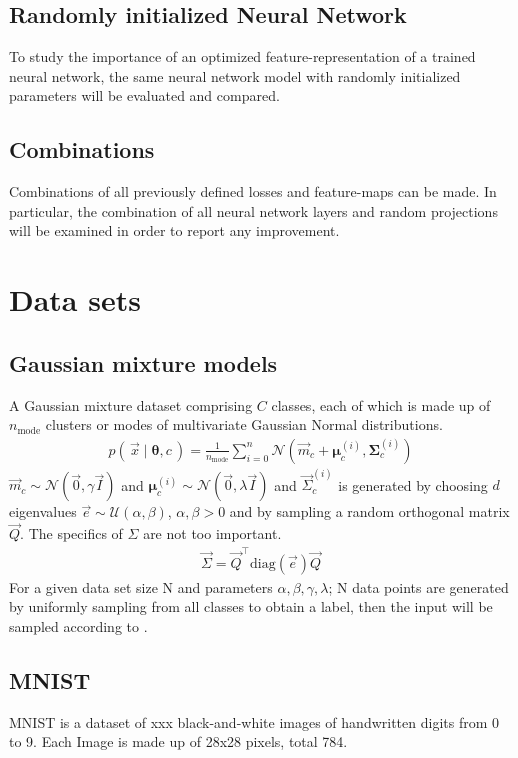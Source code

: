 \subsection{Randomly initialized Neural Network}
To study the importance of an optimized feature-representation of a trained neural network, 
the same neural network model with randomly initialized parameters will be evaluated and compared.

\subsection{Combinations}
Combinations of all previously defined losses and feature-maps can be made. In particular, the combination of all neural network layers and random projections will be examined in order to report any improvement.


\section{Data sets}
\subsection{Gaussian mixture models}
A Gaussian mixture dataset comprising $C$ classes, each of which is made up of $n_\text{mode}$ clusters or modes of multivariate Gaussian Normal distributions.
\begin{align}
\label{eqn:gmmdistr}
    p(\, \vec x \mid \boldsymbol \theta, c \,) = \frac 1 {n_\text{mode}} \sum _{i=0}^n
    \mathcal N (\vec m_c + \boldsymbol \mu_c^{(i)}, \boldsymbol \Sigma_c^{(i)})
\end{align}
$\vec m_c \sim \mathcal N (\vec 0, \gamma \vec I)$ and
$\boldsymbol \mu_c^{(i)} \sim \mathcal N (\vec 0, \lambda \vec I)$ and
$\vec \Sigma_c^{(i)}$ is generated by choosing $d$ eigenvalues $\vec e \sim \mathcal U(\alpha, \beta)$, $\alpha, \beta > 0$ and 
by sampling a random orthogonal matrix $\vec Q$. The specifics of $\Sigma$ are not too important.
\begin{align*}
    \vec \Sigma = \vec Q^\top \text{diag}(\vec e) \vec Q
\end{align*}
For a given data set size N and parameters $\alpha, \beta, \gamma, \lambda$; N data points are generated by uniformly sampling from all classes to obtain a label, then the input will be sampled according to .

\subsection{MNIST}
MNIST is a dataset of xxx black-and-white images of handwritten digits from 0 to 9. 
Each Image is made up of 28x28 pixels, total 784.

